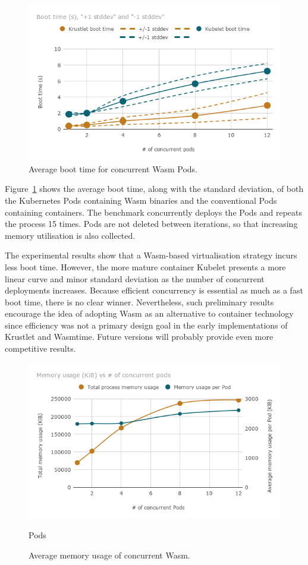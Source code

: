\begin{figure}[ht]
\centering
\includegraphics[width=\columnwidth]{figures/b-krustlet-1}
\caption{Average boot time for concurrent Wasm Pods.}
\label{fig:b-krustlet-1}
\end{figure}

Figure~\ref{fig:b-krustlet-1} shows the average boot time, along with the standard deviation, of both the Kubernetes Pods containing Wasm binaries and the conventional Pods containing containers. The benchmark concurrently deploys the Pods and repeats the process 15 times. Pods are not deleted between iterations, so that increasing memory utilisation is also collected.

The experimental results show that a Wasm-based virtualisation strategy incurs less boot time. However, the more mature container Kubelet presents a more linear curve and minor standard deviation as the number of concurrent deployments increases. Because efficient concurrency is essential as much as a fast boot time, there is no clear winner. Nevertheless, such preliminary results encourage the idea of adopting Wasm as an alternative to container technology since efficiency was not a primary design goal in the early implementations of Krustlet and Wasmtime. Future versions will probably provide even more competitive results.

\begin{figure}[ht]
\centering
\includegraphics[width=\columnwidth]{figures/b-krustlet-2}
\caption{Average memory usage of concurrent Wasm.}
Pods \label{fig:b-krustlet-2}
\end{figure}

